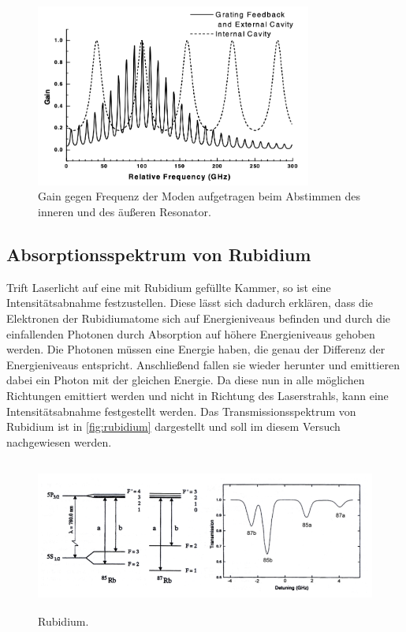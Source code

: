 \begin{figure}[H]
    \centering
    \includegraphics[height=6cm]{content/pics/moden.png}
    \caption{Gain gegen Frequenz der Moden aufgetragen beim Abstimmen des inneren und des äußeren Resonator. 
    \cite{V60}}
    \label{fig:mode}
\end{figure}

\subsection{Absorptionsspektrum von Rubidium}
Trift Laserlicht auf eine mit Rubidium gefüllte Kammer, so ist eine Intensitätsabnahme festzustellen. Diese lässt
sich dadurch erklären, dass die Elektronen der Rubidiumatome sich auf Energieniveaus befinden und durch die
einfallenden Photonen durch Absorption auf höhere Energieniveaus gehoben werden.
Die Photonen müssen eine Energie haben, die genau der Differenz der Energieniveaus entspricht. Anschließend fallen
sie wieder herunter und emittieren dabei ein Photon mit der gleichen Energie. Da diese nun in alle möglichen
Richtungen emittiert werden und nicht in Richtung des Laserstrahls, kann eine Intensitätsabnahme festgestellt werden.
Das Transmissionsspektrum von Rubidium ist in \autoref{fig:rubidium} dargestellt und soll im diesem Versuch nachgewiesen werden.

\begin{figure}[H]
    \centering
    \includegraphics[height=5cm]{content/pics/Rubidium.png}
    \caption{Rubidium. \cite{V60}}
    \label{fig:rubidium}
\end{figure}

